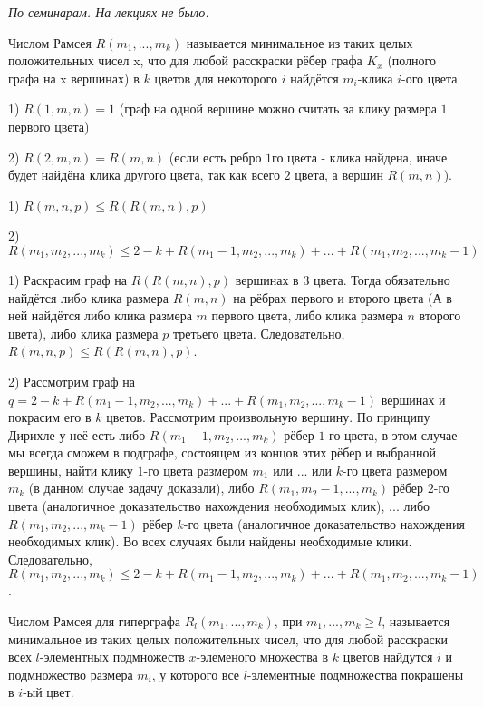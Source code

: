 \textit{По семинарам. На лекциях не было.}

\Def Числом Рамсея $R(m_1, ..., m_k)$ называется минимальное из таких целых положительных чисел x, что для любой расскраски рёбер графа $K_x$ (полного графа на x вершинах) в $k$ цветов для некоторого $i$ найдётся $m_i$-клика $i$-ого цвета.

\Example

1) $R(1, m, n) = 1$ (граф на одной вершине можно считать за клику размера $1$ первого цвета)

2) $R(2, m, n) = R(m, n)$ (если есть ребро $1$го цвета - клика найдена, иначе будет найдёна клика другого цвета, так как всего $2$ цвета, а вершин $R(m, n)$). 

\Statement

1) $R(m, n, p) \leqslant R(R(m, n), p)$

2) $R(m_1, m_2, ..., m_k) \leqslant 2 - k + R(m_1 - 1, m_2, ..., m_k) + ... + R(m_1, m_2, ..., m_k - 1) $

\Proof

1) Раскрасим граф на $R(R(m, n), p)$ вершинах в 3 цвета. Тогда обязательно найдётся либо клика размера $R(m, n)$ на рёбрах первого и второго цвета (А в ней найдётся либо клика размера $m$ первого цвета, либо клика размера $n$ второго цвета), либо клика размера $p$ третьего цвета. Следовательно, $R(m, n, p) \leqslant R(R(m, n), p)$.
 
2) Рассмотрим граф на $q = 2 - k + R(m_1 - 1, m_2, ..., m_k) + ... + R(m_1, m_2, ..., m_k - 1)$ вершинах и покрасим его в $k$ цветов. Рассмотрим произвольную вершину. По принципу Дирихле у неё есть либо $R(m_1 - 1, m_2, ..., m_k)$ рёбер $1$-го цвета, в этом случае мы всегда сможем в подграфе, состоящем из концов этих рёбер и выбранной вершины, найти клику $1$-го цвета размером $m_1$ или ... или $k$-го цвета размером $m_k$ (в данном случае задачу доказали), либо $R(m_1, m_2 - 1, ..., m_k)$ рёбер $2$-го цвета (аналогичное доказательство нахождения необходимых клик), ... либо $R(m_1, m_2, ..., m_k - 1)$ рёбер $k$-го цвета (аналогичное доказательство нахождения необходимых клик). Во всех случаях были найдены необходимые клики. Следовательно,  $R(m_1, m_2, ..., m_k) \leqslant 2 - k + R(m_1 - 1, m_2, ..., m_k) + ... + R(m_1, m_2, ..., m_k - 1)$. 

\EndProof

\Def Числом Рамсея для гиперграфа $R_l(m_1, ..., m_k)$, при $m_1, ..., m_k \geqslant l$, называется минимальное из таких целых положительных чисел, что для любой расскраски всех $l$-элементных подмножеств $x$-элеменого множества в $k$ цветов найдутся $i$ и подмножество размера $m_i$, у которого все $l$-элементные подмножества покрашены в $i$-ый цвет.

